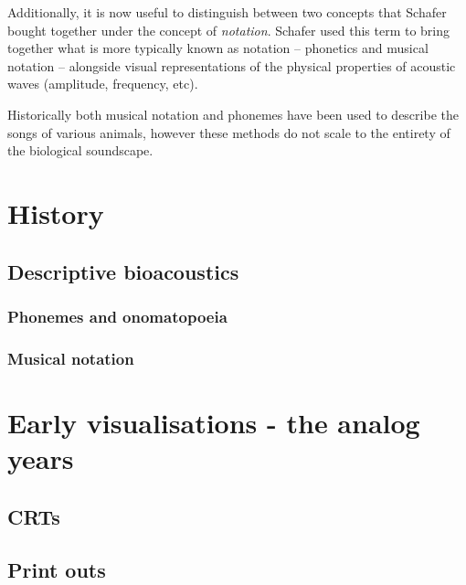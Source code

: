 \documentclass[
]{book}
\begin{document}
Additionally, it is now useful to distinguish between two concepts that Schafer bought together under the concept of \emph{notation}. Schafer used this term to bring together what is more typically known as notation -- phonetics and musical notation -- alongside visual representations of the physical properties of acoustic waves (amplitude, frequency, etc).

Historically both musical notation and phonemes have been used to describe the songs of various animals, however these methods do not scale to the entirety of the biological soundscape.

\hypertarget{history}{%
\chapter{History}\label{history}}

\hypertarget{descriptive-bioacoustics}{%
\section{Descriptive bioacoustics}\label{descriptive-bioacoustics}}

\hypertarget{phonemes-and-onomatopoeia}{%
\subsection{Phonemes and onomatopoeia}\label{phonemes-and-onomatopoeia}}

\hypertarget{musical-notation}{%
\subsection{Musical notation}\label{musical-notation}}

\hypertarget{early-viz}{%
\chapter{Early visualisations - the analog years}\label{early-viz}}

\hypertarget{crts}{%
\section{CRTs}\label{crts}}

\hypertarget{print-outs}{%
\section{Print outs}\label{print-outs}}
\end{document}
